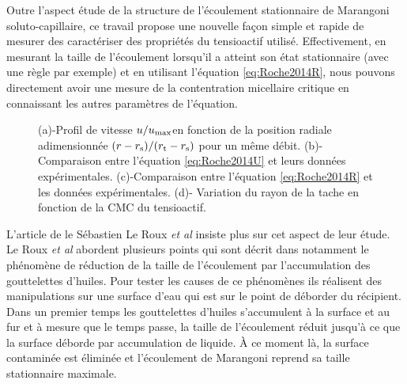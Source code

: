 Outre l'aspect étude de la structure de l'écoulement stationnaire de Marangoni soluto-capillaire, ce travail propose une nouvelle façon simple et rapide de mesurer des caractériser des propriétés du tensioactif utilisé. Effectivement, en mesurant la taille de l'écoulement lorsqu'il a atteint son état stationnaire (avec une règle par exemple) et en utilisant l'équation \eqref{eq:Roche2014R}, nous pouvons directement avoir une mesure de la contentration micellaire critique en connaissant les autres paramètres de l'équation.
\begin{figure}[!ht]
  \centering
  \resizebox{.8\textwidth}{!}{}
  \caption{(a)-Profil de vitesse $u/u_{\rm max}$en fonction de la position radiale adimensionnée $(r-r_{\rm s})/(r_{\rm t}-r_{\rm s})$ pour un même débit. (b)-Comparaison entre l'équation \eqref{eq:Roche2014U} et leurs données expérimentales. (c)-Comparaison entre l'équation \eqref{eq:Roche2014R} et les données expérimentales. (d)- Variation du rayon de la tache en fonction de la CMC du tensioactif.}
  \label{fig:Roche2014_2}
\end{figure}
L'article de le Sébastien Le Roux \textit{et al} \cite{Leroux2016} insiste plus sur cet aspect de leur étude. Le Roux \textit{et al} abordent plusieurs points qui sont décrit dans \cite{Roche2014} notamment le phénomène de réduction de la taille de l'écoulement par l'accumulation des gouttelettes d'huiles. Pour tester les causes de ce phénomènes ils réalisent des manipulations sur une surface d'eau qui est sur le point de déborder du récipient. Dans un premier temps les gouttelettes d'huiles s'accumulent à la surface et au fur et à mesure que le temps passe, la taille de l'écoulement réduit jusqu'à ce que la surface déborde par accumulation de liquide. À ce moment là, la surface contaminée est éliminée et l'écoulement de Marangoni reprend sa taille stationnaire maximale.

